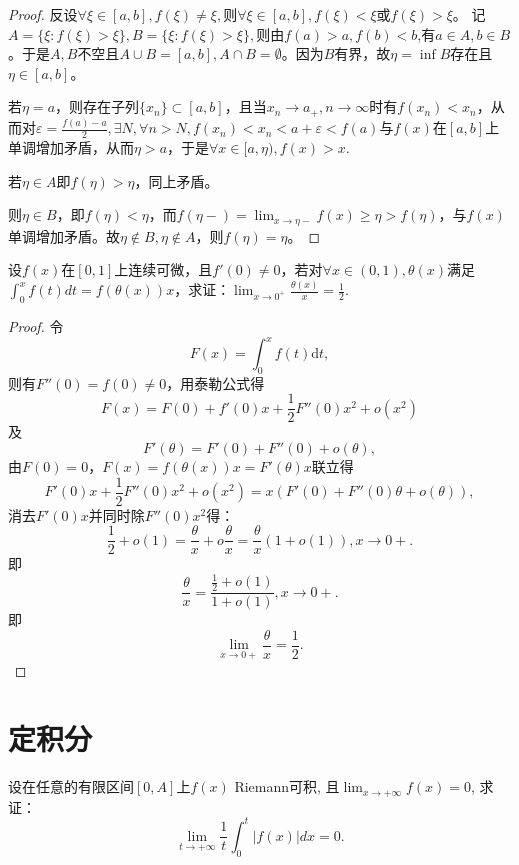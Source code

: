 \begin{proof}
  反设$\forall\xi\in[a,b],f(\xi)\neq\xi,$则$\forall\xi\in[a,b],f(\xi)<\xi$或$f(\xi)>\xi$。
  记$A=\{\xi:f(\xi)>\xi\},B=\{\xi:f(\xi)>\xi\},$则由$f(a)>a,f(b)<b$,有$a\in A,b\in B$。于是$A,B$不空且$A\cup B=[a,b],A\cap B=\emptyset$。因为$B$有界，故$\eta=\inf B$存在且$\eta\in[a,b]$。
  
  若$\eta=a$，则存在子列$\{x_n\}\subset[a,b]$，且当$x_n\rightarrow a_+,n\rightarrow\infty$时有$f(x_n)<x_n$，从而对$\varepsilon=\frac{f(a)-a}{2},\exists N,\forall n>N,f(x_n)<x_n<a+\varepsilon<f(a)$与$f(x)$在$[a,b]$上单调增加矛盾，从而$\eta>a$，于是$\forall x\in[a,\eta),f(x)>x.$
  
  若$\eta\in A$即$f(\eta)>\eta$，同上矛盾。
  
  则$\eta\in B$，即$f(\eta)<\eta$，而$f(\eta-)=\lim_{x\rightarrow\eta-}f(x)\geq\eta>f(\eta)$，与$f(x)$单调增加矛盾。故$\eta\not\in B,\eta\not\in A$，则$f(\eta)=\eta$。
  \end{proof}
  
  \begin{example}
   设$f(x)$在$[0,1]$上连续可微，且$f'(0)\neq0$，若对$\forall x\in(0,1),\theta(x)$满足$\int_0^xf(t)dt=f(\theta(x))x$，求证：$\displaystyle \lim_{x\rightarrow 0^+}\frac{\theta(x)}x=\frac12$.
  \end{example}
  
  \begin{proof}
     令$$F(x)=\int_0^xf(t)\mathrm{d}t,$$
  则有$F''(0)=f(0)\neq0$，用泰勒公式得
  $$F(x)=F(0)+f'(0)x+\frac{1}{2}F''(0)x^2+o(x^2)$$
  及
  $$F'(\theta)=F'(0)+F''(0)+o(\theta),$$
  由$F(0)=0$，$F(x)=f(\theta(x))x=F'(\theta)x$联立得
  $$F'(0)x+\frac{1}{2}F''(0)x^2+o(x^2)=x(F'(0)+F''(0)\theta+o(\theta)),$$
  消去$F'(0)x$并同时除$F''(0)x^2$得：
  $$\frac{1}{2}+o(1)=\frac{\theta}{x}+o\frac{\theta}{x}=\frac{\theta}{x}(1+o(1)),x\rightarrow0+.$$
  即
  $$\frac{\theta}{x}=\frac{\frac{1}{2}+o(1)}{1+o(1)},x\rightarrow0+.$$
  即
  $$\lim_{x\rightarrow0+}\frac{\theta}{x}=\frac{1}{2}.$$
  \end{proof}
 
  
\section{定积分}

  \begin{example}
  设在任意的有限区间$[0,A]$上$f(x)$ Riemann可积,
  且$\lim_{x\rightarrow+\infty}f(x)=0$,
  求证：
  \begin{equation} 
  \lim_{t\rightarrow+\infty}\frac 1t\int_0^t|f(x)|dx=0.
  \end{equation} 
\end{example}

